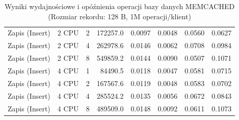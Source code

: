\begin{table}[ht]
{\begin{tabular}{llcrrrrr}
Zapis (Insert) & 2 CPU & 2 & 172257.0 & 0.0097 & 0.0048 & 0.0560 & 0.0627 \\
Zapis (Insert) & 2 CPU & 4 & 262978.6 & 0.0146 & 0.0062 & 0.0708 & 0.0984 \\
Zapis (Insert) & 2 CPU & 8 & 549859.2 & 0.0144 & 0.0090 & 0.0507 & 0.1071 \\
Zapis (Insert) & 4 CPU & 1 & 84490.5 & 0.0118 & 0.0047 & 0.0581 & 0.0715 \\
Zapis (Insert) & 4 CPU & 2 & 167567.6 & 0.0119 & 0.0048 & 0.0583 & 0.0702 \\
Zapis (Insert) & 4 CPU & 4 & 285524.2 & 0.0135 & 0.0056 & 0.0672 & 0.0843 \\
Zapis (Insert) & 4 CPU & 8 & 489509.0 & 0.0148 & 0.0092 & 0.0611 & 0.1073 \\
\bottomrule
\end{tabular}%
}
\caption{Wyniki wydajnościowe i opóźnienia operacji bazy danych MEMCACHED (Rozmiar rekordu: 128 B, 1M operacji/klient)}
\label{tab:latency_memcached_small_1000000}
\end{table}
